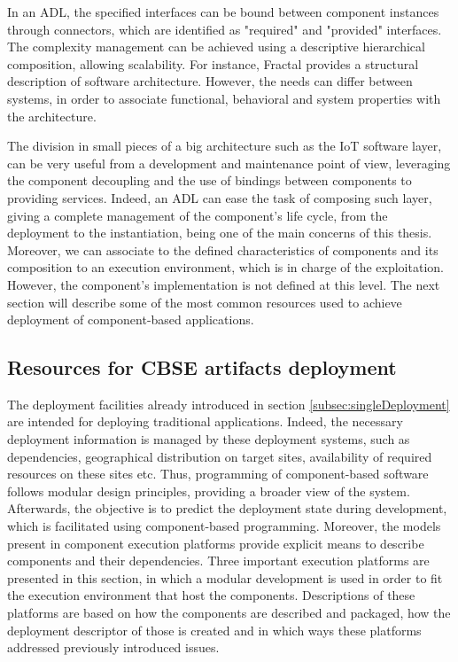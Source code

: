 In an ADL, the specified interfaces can be bound between component instances through connectors, which are identified as "required" and "provided" interfaces.
The complexity management can be achieved using a descriptive hierarchical composition, allowing scalability.
For instance, Fractal\cite{bruneton2006fractal} provides a structural description of software architecture.
However, the needs can differ between systems, in order to associate functional, behavioral and system properties with the architecture.

The division in small pieces of a big architecture such as the IoT software layer, can be very useful from a development and maintenance point of view, leveraging the component decoupling and the use of bindings between components to providing services.
Indeed, an ADL can ease the task of composing such layer, giving a complete management of the component's life cycle, from the deployment to the instantiation, being one of the main concerns of this thesis.
Moreover, we can associate to the defined characteristics of components and its composition to an execution environment, which is in charge of the exploitation.
However, the component's implementation is not defined at this level.
The next section will describe some of the most common resources used to achieve deployment of component-based applications.

\subsection{Resources for CBSE artifacts deployment}
The deployment facilities already introduced in section \ref{subsec:singleDeployment} are intended for deploying traditional applications.
Indeed, the necessary deployment information is managed by these deployment systems, such as dependencies, geographical distribution on target sites, availability of required resources on these sites etc.
Thus, programming of component-based software follows modular design principles, providing a broader view of the system.
Afterwards, the objective is to predict the deployment state during development, which is facilitated using component-based programming.
Moreover, the models present in component execution platforms provide explicit means to describe components and their dependencies.
Three important execution platforms are presented in this section, in which a modular development is used in order to fit the execution environment that host the components.
Descriptions of these platforms are based on how the components are described and packaged, how the deployment descriptor of those is created and in which ways these platforms addressed previously introduced issues.

